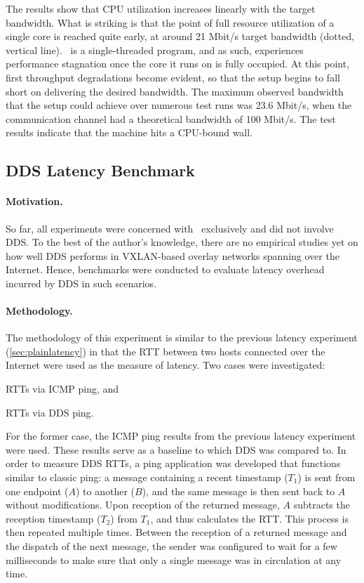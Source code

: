 The results show that CPU utilization increases linearly with the target bandwidth. What is striking is that the point of full resource utilization of a single core is reached quite early, at around 21 Mbit/s target bandwidth (dotted, vertical line). \wnet\ is a single-threaded program, and as such, experiences performance stagnation once the core it runs on is fully occupied. At this point, first throughput degradations become evident, so that the setup begins to fall short on delivering the desired bandwidth. The maximum observed bandwidth that the setup could achieve over numerous test runs was 23.6 Mbit/s, when the communication channel had a theoretical bandwidth of 100 Mbit/s. The test results indicate that the machine hits a CPU-bound wall.

%
%
%
%
%
%
%
%
%
%

\subsection{DDS Latency Benchmark} \label{sec:ddslatency}

\paragraph{Motivation.} So far, all experiments were concerned with \wnet\ exclusively and did not involve DDS. To the best of the author's knowledge, there are no empirical studies yet on how well DDS performs in VXLAN-based overlay networks spanning over the Internet. Hence, benchmarks were conducted to evaluate latency overhead incurred by DDS in such scenarios.

\paragraph{Methodology.} The methodology of this experiment is similar to the previous latency experiment (\autoref{sec:plainlatency}) in that the RTT between two hosts connected over the Internet were used as the measure of latency. Two cases were investigated: 
\begin{inparaenum}[(i)]
	\item RTTs via ICMP ping, and
	\item RTTs via DDS ping.
\end{inparaenum}
For the former case, the ICMP ping results from the previous latency experiment were used. These results serve as a baseline to which DDS was compared to. In order to measure DDS RTTs, a ping application was developed that functions similar to classic ping: a message containing a recent timestamp ($T_1$) is sent from one endpoint ($A$) to another ($B$), and the same message is then sent back to $A$ without modifications. Upon reception of the returned message, $A$ subtracts the reception timestamp ($T_2$) from $T_1$, and thus calculates the RTT. This process is then repeated multiple times. Between the reception of a returned message and the dispatch of the next message, the sender was configured to wait for a few milliseconds to make sure that only a single message was in circulation at any time.

